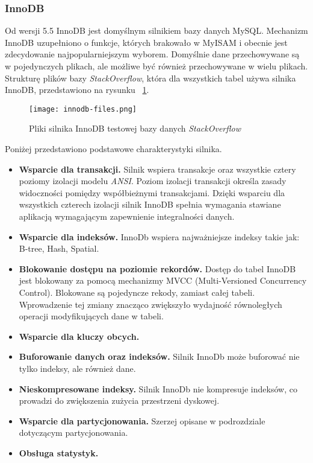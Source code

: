 \subsubsection{InnoDB}
Od wersji 5.5 InnoDB jest domyślnym silnikiem bazy danych MySQL. Mechanizm InnoDB uzupełniono o funkcje, których brakowało w MyISAM i obecnie jest zdecydowanie najpopularniejszym wyborem. Domyślnie dane przechowywane są w pojedynczych plikach, ale możliwe być również przechowywane w wielu plikach. Strukturę plików bazy \textit{StackOverflow}, która dla wszystkich tabel używa silnika InnoDB, przedstawiono na rysunku ~\ref{fig:innodb-fileslabel}.
\begin{figure}
	\caption{Pliki silnika InnoDB testowej bazy danych \textit{StackOverflow}}
	\centering
	\texttt{[image: innodb-files.png]}
	\label{fig:innodb-fileslabel}
\end{figure}
Poniżej przedstawiono podstawowe charakterystyki silnika.
\begin{itemize}
	\item \textbf{Wsparcie dla transakcji.} Silnik wspiera transakcje oraz wszystkie cztery poziomy izolacji modelu \textit{ANSI}. Poziom izolacji transakcji określa zasady widoczności pomiędzy współbieżnymi transakcjami. Dzięki wsparciu dla wszystkich czterech izolacji  silnik InnoDB spełnia wymagania stawiane aplikacją wymagającym zapewnienie integralności danych. 
	\item \textbf{Wsparcie dla indeksów.} InnoDb wspiera najważniejsze indeksy takie jak: B-tree, Hash, Spatial.
	\item \textbf{Blokowanie dostępu na poziomie rekordów. } Dostęp do tabel InnoDB jest blokowany za pomocą mechanizmy MVCC (Multi-Versioned Concurrency Control). Blokowane są pojedyncze rekody, zamiast całej tabeli. Wprowadzenie tej zmiany znacząco zwiększyło wydajność równoległych operacji modyfikujących dane w tabeli.
	\item \textbf{Wsparcie dla kluczy obcych.}
	\item \textbf{Buforowanie danych oraz indeksów.} Silnik InnoDb może buforować nie tylko indeksy, ale również dane.
	\item  \textbf{Nieskompresowane indeksy.} Silnik InnoDb nie kompresuje indeksów, co prowadzi do zwiększenia zużycia przestrzeni dyskowej.
	\item \textbf{Wsparcie dla partycjonowania.} Szerzej opisane w podrozdziale dotyczącym partycjonowania.
	\item \textbf{Obsługa statystyk.}
\end{itemize}


